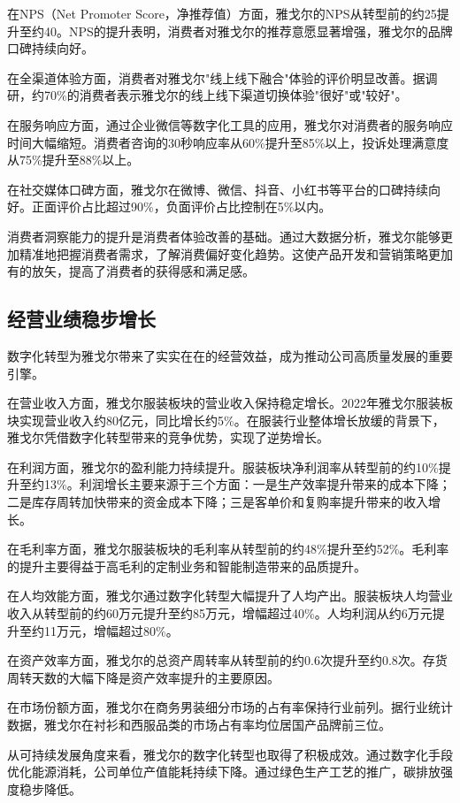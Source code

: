 \documentclass[12pt,a4paper]{article}
\begin{document}
在NPS（Net Promoter Score，净推荐值）方面，雅戈尔的NPS从转型前的约25提升至约40。NPS的提升表明，消费者对雅戈尔的推荐意愿显著增强，雅戈尔的品牌口碑持续向好。

在全渠道体验方面，消费者对雅戈尔"线上线下融合"体验的评价明显改善。据调研，约70\%的消费者表示雅戈尔的线上线下渠道切换体验"很好"或"较好"。

在服务响应方面，通过企业微信等数字化工具的应用，雅戈尔对消费者的服务响应时间大幅缩短。消费者咨询的30秒响应率从60\%提升至85\%以上，投诉处理满意度从75\%提升至88\%以上。

在社交媒体口碑方面，雅戈尔在微博、微信、抖音、小红书等平台的口碑持续向好。正面评价占比超过90\%，负面评价占比控制在5\%以内。

消费者洞察能力的提升是消费者体验改善的基础。通过大数据分析，雅戈尔能够更加精准地把握消费者需求，了解消费偏好变化趋势。这使产品开发和营销策略更加有的放矢，提高了消费者的获得感和满足感。

\subsection{经营业绩稳步增长}

数字化转型为雅戈尔带来了实实在在的经营效益，成为推动公司高质量发展的重要引擎。

在营业收入方面，雅戈尔服装板块的营业收入保持稳定增长。2022年雅戈尔服装板块实现营业收入约80亿元，同比增长约5\%。在服装行业整体增长放缓的背景下，雅戈尔凭借数字化转型带来的竞争优势，实现了逆势增长。

在利润方面，雅戈尔的盈利能力持续提升。服装板块净利润率从转型前的约10\%提升至约13\%。利润增长主要来源于三个方面：一是生产效率提升带来的成本下降；二是库存周转加快带来的资金成本下降；三是客单价和复购率提升带来的收入增长。

在毛利率方面，雅戈尔服装板块的毛利率从转型前的约48\%提升至约52\%。毛利率的提升主要得益于高毛利的定制业务和智能制造带来的品质提升。

在人均效能方面，雅戈尔通过数字化转型大幅提升了人均产出。服装板块人均营业收入从转型前的约60万元提升至约85万元，增幅超过40\%。人均利润从约6万元提升至约11万元，增幅超过80\%。

在资产效率方面，雅戈尔的总资产周转率从转型前的约0.6次提升至约0.8次。存货周转天数的大幅下降是资产效率提升的主要原因。

在市场份额方面，雅戈尔在商务男装细分市场的占有率保持行业前列。据行业统计数据，雅戈尔在衬衫和西服品类的市场占有率均位居国产品牌前三位。

从可持续发展角度来看，雅戈尔的数字化转型也取得了积极成效。通过数字化手段优化能源消耗，公司单位产值能耗持续下降。通过绿色生产工艺的推广，碳排放强度稳步降低。
\end{document}
